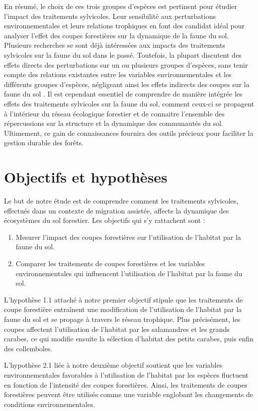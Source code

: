 En résumé, le choix de ces trois groupes d'espèces est pertinent pour étudier l'impact des traitements sylvicoles. 
Leur sensibilité aux perturbations environnementales et leurs relations trophiques en font des candidat idéal pour analyser l'effet des coupes forestières sur la dynamique de la faune du sol.
Plusieurs recherches se sont déjà intéressées aux impacts des traitements sylvicoles sur la faune du sol dans le passé. 
Toutefois, la plupart discutent des effets directs des perturbations sur un ou plusieurs groupes d'espèces, 
sans tenir compte des relations existantes entre les variables environnementales et les différents groupes d'espèces, 
négligeant ainsi les effets indirects des coupes sur la faune du sol \citep{josephIntegratingOccupancyModels2016,Kudrin2023metaanalysiseffects,Pollierer2021Diversityfunctional}. 
Il est cependant essentiel de comprendre de manière intégrée les effets des traitements sylvicoles sur la faune du sol, 
comment ceux-ci se propagent à l'intérieur du réseau écologique forestier et de connaitre l'ensemble des répercussions sur la structure 
et la dynamique des communautés du sol. 
Ultimement, ce gain de connaissances fournira des outils précieux pour faciliter la gestion durable des forêts.

\section*{Objectifs et hypothèses}
\label{sec:objectifs}

Le but de notre étude est de comprendre comment les traitements sylvicoles, effectués dans un contexte de migration assistée, affecte la dynamique des écosystèmes du sol forestier.
Les objectifs qui s'y rattachent sont : 

\begin{enumerate}
    \item Mesurer l'impact des coupes forestières sur l'utilisation de l'habitat par la faune du sol.
    \item Comparer les traitements de coupes forestières et les variables environnementales qui influencent l'utilisation de l'habitat par la faune du sol. 
\end{enumerate}

L'hypothèse 1.1 attaché à notre premier objectif stipule que les traitements de coupe forestière entraînent une modification de l'utilisation de l'habitat 
par la faune du sol et se propage à travers le réseau trophique. Plus précisément, les coupes affectent l'utilisation de l'habitat par les salamandres et 
les grands carabes, ce qui modifie ensuite la sélection d'habitat des petits carabes, puis enfin des collemboles.

L'hypothèse 2.1 liée à notre deuxième objectif soutient que les variables environnementales favorables à l'utilisation de l'habitat par les espèces fluctuent 
en fonction de l'intensité des coupes forestières. Ainsi, les traitements de coupes forestières peuvent être utilisés comme une variable englobant 
les changements de conditions environnementales.

\cleardoublepage



